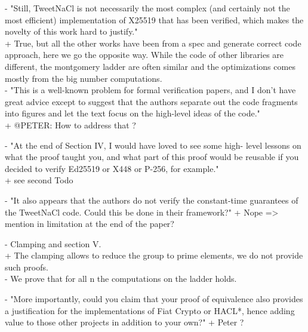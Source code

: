 {- "Still, TweetNaCl is not necessarily the most complex (and certainly not the most
efficient) implementation of X25519 that has been verified, which makes the
novelty of this work hard to justify."\\
+ True, but all the other works have been from a spec and generate correct code
approach, here we go the opposite way. While the code of other libraries are
different, the montgomery ladder are often similar and the optimizations comes
mostly from the big number computations.\\

- "This is a well-known problem for formal
verification papers, and I don’t have great advice except to suggest
that the authors separate out the code fragments into figures and
let the text focus on the high-level ideas of the code."\\
+ @PETER: How to address that ?

- "At the end of Section IV, I would have loved to see some high-
level lessons on what the proof taught you, and what part of this
proof would be reusable if you decided to verify Ed25519 or X448
or P-256, for example."\\
+ see second Todo

- "It also appears that the authors do not verify the constant-time
guarantees of the TweetNaCl code. Could this be done in their
framework?"
+ Nope => mention in limitation at the end of the paper?

- Clamping and section V.\\
+ The clamping allows to reduce the group to prime elements, we do not provide
such proofs.\\
- We prove that for all n the computations on the ladder holds.

- "More importantly, could you claim that your proof of equivalence also provides
a justification for the implementations of Fiat Crypto or HACL*, hence adding
value to those other projects in addition to your own?"
+ Peter ?
}
